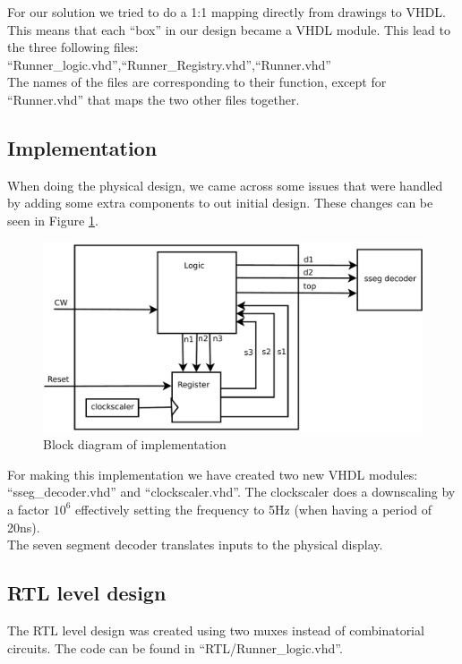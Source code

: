 For our solution we tried to do a 1:1 mapping directly from drawings to VHDL. This means that each ``box'' in our design
became a VHDL module. This lead to the three following files: ``Runner\_logic.vhd'',``Runner\_Registry.vhd'',``Runner.vhd''\\
The names of the files are corresponding to their function, except for ``Runner.vhd'' that maps the two other files together.\\
\subsection{Implementation}
When doing the physical design, we came across some issues that were handled by adding some extra components to out initial design. 
These changes can be seen in Figure \ref{fig:block_diagram_implementation}.
\begin{figure}[!htbp] 
	\centering 
        \includegraphics[height=0.4\textwidth]{fig/Block_diagram_implementation.pdf}
	\caption{Block diagram of implementation}
	\label{fig:block_diagram_implementation} 
\end{figure}
For making this implementation we have created two new VHDL modules: ``sseg\_decoder.vhd'' and ``clockscaler.vhd''. The clockscaler does a downscaling by a factor $10^{6}$ effectively setting the frequency to 5Hz (when having a period of 20ns).\\
The seven segment decoder translates inputs to the physical display.

\subsection{RTL level design}
The RTL level design was created using two muxes instead of combinatorial circuits. The code can be found in ``RTL/Runner\_logic.vhd''.